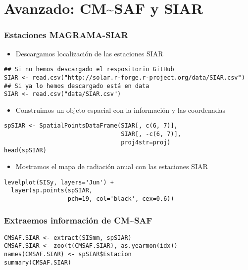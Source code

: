\documentclass[xcolor={usenames,svgnames,dvipsnames}]{beamer}
\begin{document}
\section{Avanzado: CM\~{}SAF y SIAR}
\label{sec-4}
\begin{frame}[fragile]
\frametitle{Estaciones MAGRAMA-SIAR}
\label{sec-4-1}

\begin{itemize}
\item Descargamos localización de las estaciones SIAR
\end{itemize}

\lstset{language=R}
\begin{lstlisting}
## Si no hemos descargado el respositorio GitHub
SIAR <- read.csv("http://solar.r-forge.r-project.org/data/SIAR.csv")
## Si ya lo hemos descargado está en data
SIAR <- read.csv("data/SIAR.csv")
\end{lstlisting}
\begin{itemize}
\item Construimos un objeto espacial con la información y las coordenadas
\end{itemize}

\lstset{language=R}
\begin{lstlisting}
spSIAR <- SpatialPointsDataFrame(SIAR[, c(6, 7)],
                                 SIAR[, -c(6, 7)],
                                 proj4str=proj)
head(spSIAR)
\end{lstlisting}
\begin{itemize}
\item Mostramos el mapa de radiación anual con las estaciones SIAR
\end{itemize}

\lstset{language=R}
\begin{lstlisting}
levelplot(SISy, layers='Jun') +
  layer(sp.points(spSIAR,
                  pch=19, col='black', cex=0.6))
\end{lstlisting}
  
\end{frame}
\begin{frame}[fragile]
\frametitle{Extraemos información de CM\~{}SAF}
\label{sec-4-2}


\lstset{language=R}
\begin{lstlisting}
CMSAF.SIAR <- extract(SISmm, spSIAR)
CMSAF.SIAR <- zoo(t(CMSAF.SIAR), as.yearmon(idx))
names(CMSAF.SIAR) <- spSIAR$Estacion
summary(CMSAF.SIAR)
\end{lstlisting}
\end{frame}
\end{document}
